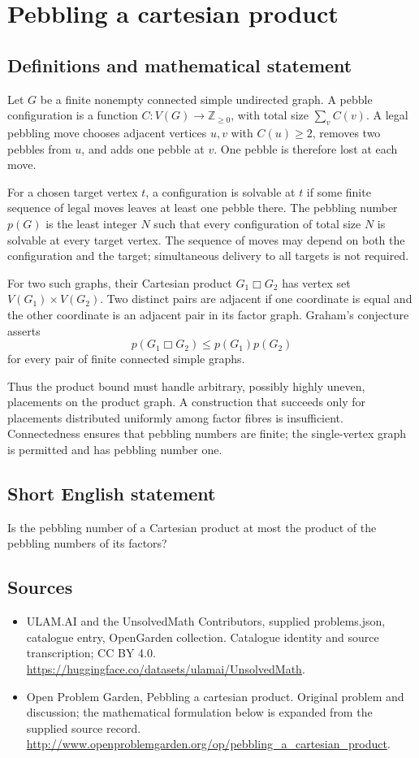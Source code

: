 \documentclass[11pt,a4paper]{article}
\begin{document}
\section*{Pebbling a cartesian product}\label{statement}

\subsection{Definitions and mathematical statement}
Let $G$ be a finite nonempty connected simple undirected graph.
A pebble configuration is a function $C:V(G)\to\mathbb Z_{\ge0}$,
with total size $\sum_v C(v)$. A legal pebbling move chooses adjacent
vertices $u,v$ with $C(u)\ge2$, removes two pebbles from $u$, and adds
one pebble at $v$. One pebble is therefore lost at each move.

For a chosen target vertex $t$, a configuration is solvable at $t$ if
some finite sequence of legal moves leaves at least one pebble there.
The pebbling number $p(G)$ is the least integer $N$ such that every
configuration of total size $N$ is solvable at every target vertex.
The sequence of moves may depend on both the configuration and the
target; simultaneous delivery to all targets is not required.

For two such graphs, their Cartesian product $G_1\mathbin\Box G_2$ has
vertex set $V(G_1)\times V(G_2)$. Two distinct pairs are adjacent if
one coordinate is equal and the other coordinate is an adjacent pair
in its factor graph.
Graham's conjecture asserts
\[
 p(G_1\mathbin\Box G_2)\le p(G_1)p(G_2)
\]
for every pair of finite connected simple graphs.

Thus the product bound must handle arbitrary, possibly highly uneven,
placements on the product graph. A construction that succeeds only for
placements distributed uniformly among factor fibres is insufficient.
Connectedness ensures that pebbling numbers are finite; the single-vertex
graph is permitted and has pebbling number one.
\subsection{Short English statement}
Is the pebbling number of a Cartesian product at most the product of the pebbling numbers of its factors?
\subsection{Sources}
\begin{itemize}
\item[S1] ULAM.AI and the UnsolvedMath Contributors, supplied problems.json, catalogue entry, OpenGarden collection. Catalogue identity and source transcription; CC BY 4.0.
\url{https://huggingface.co/datasets/ulamai/UnsolvedMath}.
\item[S2] Open Problem Garden, Pebbling a cartesian product. Original problem and discussion; the mathematical formulation below is expanded from the supplied source record.
\url{http://www.openproblemgarden.org/op/pebbling_a_cartesian_product}.
\end{itemize}
\end{document}
